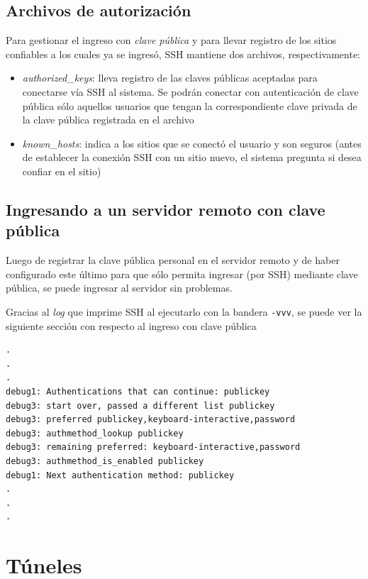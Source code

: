 \subsection{Archivos de autorización}

Para gestionar el ingreso con \emph{clave pública} y para llevar registro de los sitios confiables a los cuales ya se ingresó, SSH mantiene dos archivos, respectivamente:

\begin{itemize}
    \item \emph{authorized\_keys}: lleva registro de las claves públicas aceptadas para conectarse vía SSH al sistema. Se podrán conectar con autenticación de clave pública sólo aquellos usuarios que tengan la correspondiente clave privada de la clave pública registrada en el archivo 
    \item \emph{known\_hosts}: indica a los sitios que se conectó el usuario y son seguros (antes de establecer la conexión SSH con un sitio nuevo, el sistema pregunta si desea confiar en el sitio) 
\end{itemize}

\subsection{Ingresando a un servidor remoto con clave pública}

Luego de registrar la clave pública personal en el servidor remoto y de haber configurado este último para que sólo permita ingresar (por SSH) mediante clave pública, se puede ingresar al servidor sin problemas.

Gracias al \emph{log} que imprime SSH al ejecutarlo con la bandera \texttt{-vvv}, se puede ver la siguiente sección con respecto al ingreso con clave pública

\begin{lstlisting}
.
.
.
debug1: Authentications that can continue: publickey
debug3: start over, passed a different list publickey
debug3: preferred publickey,keyboard-interactive,password
debug3: authmethod_lookup publickey
debug3: remaining preferred: keyboard-interactive,password
debug3: authmethod_is_enabled publickey
debug1: Next authentication method: publickey
.
.
.
\end{lstlisting}

\section{Túneles}

